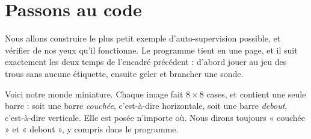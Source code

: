\section{Passons au code}

Nous allons construire le plus petit exemple d'auto-supervision possible, et
vérifier de nos yeux qu'il fonctionne. Le programme tient en une page, et il
suit exactement les deux temps de l'encadré précédent : d'abord jouer au jeu
des trous sans aucune étiquette, ensuite geler et brancher une sonde.

Voici notre monde miniature. Chaque image fait $8 \times 8$ cases, et contient
une seule barre : soit une barre \emph{couchée}, c'est-à-dire horizontale,
soit une barre \emph{debout}, c'est-à-dire verticale. Elle est posée
n'importe où. Nous dirons toujours « couchée » et « debout », y compris dans
le programme.

